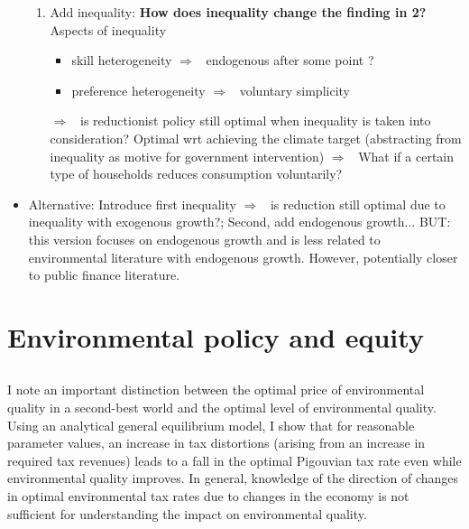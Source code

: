 \documentclass[12pt]{article}
\newcommand{\ar}{$\Rightarrow$ \ }
\begin{document}
\begin{itemize}
\begin{enumerate}
		\item Add inequality: \textbf{How does inequality change the finding in 2?} Aspects of inequality
		\begin{itemize}
			\item skill heterogeneity \ar endogenous after some point ?
			\item preference heterogeneity \ar voluntary simplicity
		\end{itemize}
		\ar is reductionist policy still optimal when inequality is taken into consideration? Optimal wrt achieving the climate target (abstracting from inequality as motive for government intervention)
		\ar What if a certain type of households reduces consumption voluntarily?
	\end{enumerate}
	\item Alternative: Introduce first inequality \ar is reduction still optimal due to inequality with exogenous growth?; Second, add endogenous growth... BUT: this version focuses on endogenous growth and is less related to environmental literature with endogenous growth. However, potentially closer to public finance literature.
\end{itemize}

\section{Environmental policy and equity}
\subsection{\cite{Metcalf2003EnvironmentalPollution}}
I note an important distinction between the optimal price of environmental quality in a second-best world and the optimal level of environmental quality. Using an analytical general equilibrium model, I show that for reasonable parameter values, an increase in tax distortions (arising from an increase in required tax revenues) leads to a fall in the optimal Pigouvian tax rate even while environmental quality improves. In general, knowledge of the direction of changes in optimal environmental tax rates due to changes in the economy is not sufficient for understanding the impact on environmental quality.
\subsection{\cite{Goulder2019IncomeGroups}} 
\end{document}
